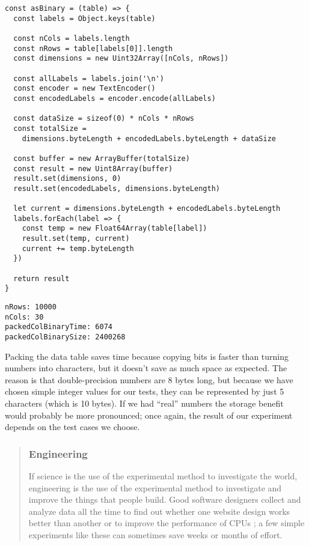 \documentclass[krantzl]{krantz}
\newenvironment{callout}{\savenotes\begin{tBox}\begin{quotation}\toggletrue{inbox}\renewcommand{\thempfootnote}{\arabic{footnote}}}{\end{quotation}\vspace{\baselineskip}\end{tBox}\togglefalse{inbox}\spewnotes}
\begin{document}
\begin{lstlisting}[frame=tblr]
const asBinary = (table) => {
  const labels = Object.keys(table)

  const nCols = labels.length
  const nRows = table[labels[0]].length
  const dimensions = new Uint32Array([nCols, nRows])

  const allLabels = labels.join('\n')
  const encoder = new TextEncoder()
  const encodedLabels = encoder.encode(allLabels)

  const dataSize = sizeof(0) * nCols * nRows
  const totalSize =
    dimensions.byteLength + encodedLabels.byteLength + dataSize

  const buffer = new ArrayBuffer(totalSize)
  const result = new Uint8Array(buffer)
  result.set(dimensions, 0)
  result.set(encodedLabels, dimensions.byteLength)

  let current = dimensions.byteLength + encodedLabels.byteLength
  labels.forEach(label => {
    const temp = new Float64Array(table[label])
    result.set(temp, current)
    current += temp.byteLength
  })

  return result
}
\end{lstlisting}



\begin{lstlisting}[frame=tblr,backgroundcolor=\color{black!5}]
nRows: 10000
nCols: 30
packedColBinaryTime: 6074
packedColBinarySize: 2400268
\end{lstlisting}



Packing the data table saves time
because copying bits is faster than turning numbers into characters,
but it doesn’t save as much space as expected.
The reason is that double-precision numbers are 8 bytes long,
but because we have chosen simple integer values for our tests,
they can be represented by just 5 characters (which is 10 bytes).
If we had “real” numbers the storage benefit would probably be more pronounced;
once again,
the result of our experiment depends on the test cases we choose.

\begin{callout}


\subsubsection*{Engineering}


If science is the use of the experimental method to investigate the world,
engineering is the use of the experimental method
to investigate and improve the things that people build.
Good software designers collect and analyze data all the time
to find out whether one website design works better than another \cite{Kohavi2020}
or to improve the performance of CPUs \cite{Patterson2017};
a few simple experiments like these can sometimes save weeks or months of effort.

\end{callout}
\end{document}
